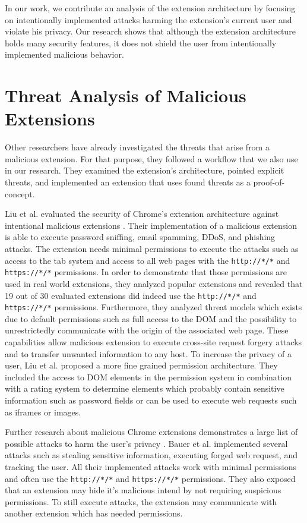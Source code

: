  	In our work, we contribute an analysis of the extension architecture by focusing on intentionally implemented attacks harming the extension's current user and violate his privacy. Our research shows that although the extension architecture holds many security features, it does not shield the user from intentionally implemented malicious behavior.
 
 \section{Threat Analysis of Malicious Extensions}
 \label{sec:relatedWorks:threatAnalysis}
 
	Other researchers have already investigated the threats that arise from a malicious extension. For that purpose, they followed a workflow that we also use in our research. They examined the extension's architecture, pointed explicit threats, and implemented an extension that uses found threats as a proof-of-concept.
 
	Liu et al. evaluated the security of Chrome's extension architecture against intentional malicious extensions \cite{Liu12chromeextensions:}. Their implementation of a malicious extension is able to execute password sniffing, email spamming, DDoS, and phishing attacks. The extension needs minimal permissions to execute the attacks such as access to the tab system and access to all web pages with the \texttt{http://*/*} and \texttt{https://*/*} permissions. In order to demonstrate that those permissions are used in real world extensions, they analyzed popular extensions and revealed that 19 out of 30 evaluated extensions did indeed use the \texttt{http://*/*} and \texttt{https://*/*} permissions. Furthermore, they analyzed threat models which exists due to default permissions such as full access to the DOM and the possibility to unrestrictedly communicate with the origin of the associated web page. These capabilities allow malicious extension to execute cross-site request forgery attacks and to transfer unwanted information to any host. To increase the privacy of a user, Liu et al. proposed a more fine grained permission architecture. They included the access to DOM elements in the permission system in combination with a rating system to determine elements which probably contain sensitive information such as password fields or can be used to execute web requests such as iframes or images. 
	 	
	Further research about malicious Chrome extensions demonstrates a large list of possible attacks to harm the user's privacy \cite{extensions:cns14}. Bauer et al. implemented several attacks such as stealing sensitive information, executing forged web request, and tracking the user. All their implemented attacks work with minimal permissions and often use the \texttt{http://*/*} and \texttt{https://*/*} permissions. They also exposed that an extension may hide it's malicious intend by not requiring suspicious permissions. To still execute attacks, the extension may communicate with another extension which has needed permissions.
	 
